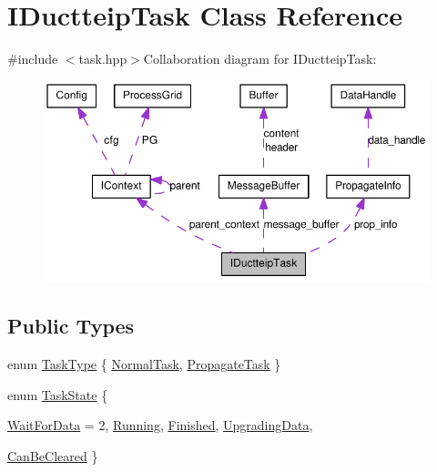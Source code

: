 \hypertarget{class_i_ductteip_task}{
\section{IDuctteipTask Class Reference}
\label{class_i_ductteip_task}
}


{\ttfamily \#include $<$task.hpp$>$}Collaboration diagram for IDuctteipTask:\nopagebreak
\begin{figure}[H]
\begin{center}
\leavevmode
\includegraphics[width=394pt]{class_i_ductteip_task__coll__graph}
\end{center}
\end{figure}
\subsection*{Public Types}
\begin{DoxyCompactItemize}
\item 
enum \hyperlink{class_i_ductteip_task_a7f8f5e47d9590cb18a31f1b2860154d0}{TaskType} \{ \hyperlink{class_i_ductteip_task_a7f8f5e47d9590cb18a31f1b2860154d0a8e4e71fb86fb7236ab752d5a860c8548}{NormalTask}, 
\hyperlink{class_i_ductteip_task_a7f8f5e47d9590cb18a31f1b2860154d0a92cdf4ae80eb4c524b00cbbb3a9a2e0f}{PropagateTask}
 \}
\item 
enum \hyperlink{class_i_ductteip_task_aa73f68557d24801eba9ab1ca61a6d8b8}{TaskState} \{ \par
\hyperlink{class_i_ductteip_task_aa73f68557d24801eba9ab1ca61a6d8b8a4f35a0ab665e980d0f9a3547abcc909c}{WaitForData} = 2, 
\hyperlink{class_i_ductteip_task_aa73f68557d24801eba9ab1ca61a6d8b8a7e8dca5fd69a1c6780acce2f551e04ee}{Running}, 
\hyperlink{class_i_ductteip_task_aa73f68557d24801eba9ab1ca61a6d8b8a2e345507c799f0cae7c77b35496aef1a}{Finished}, 
\hyperlink{class_i_ductteip_task_aa73f68557d24801eba9ab1ca61a6d8b8a25d5dc05079079201f84b137e4b9a3a8}{UpgradingData}, 
\par
\hyperlink{class_i_ductteip_task_aa73f68557d24801eba9ab1ca61a6d8b8a1dd648383ed6b8a4132bf17552ed97b1}{CanBeCleared}
 \}
\end{DoxyCompactItemize}
